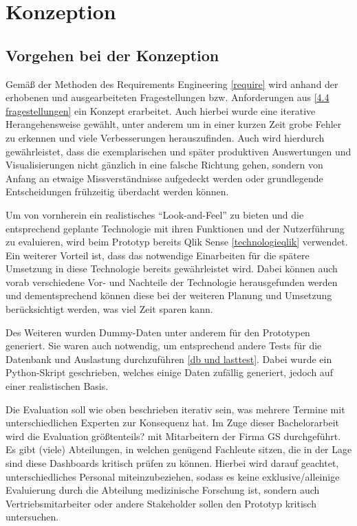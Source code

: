 \chapter{Konzeption}
\label{konzept}

\minitoc\pagebreak

\section{Vorgehen bei der Konzeption}


Gemäß der Methoden des Requirements Engineering \ref{require} wird anhand der erhobenen und ausgearbeiteten Fragestellungen bzw. Anforderungen aus \ref{4.4 fragestellungen} ein Konzept erarbeitet. 
Auch hierbei wurde eine iterative Herangehensweise gewählt, unter anderem um in einer kurzen Zeit grobe Fehler zu erkennen und viele Verbesserungen herauszufinden. 
Auch wird hierdurch gewährleistet, dass die exemplarischen und später produktiven Auswertungen und Visualisierungen nicht gänzlich in eine falsche Richtung gehen, sondern von Anfang an etwaige Missverständnisse aufgedeckt werden oder grundlegende Entscheidungen frühzeitig überdacht werden können.

Um von vornherein ein realistisches "`Look-and-Feel"' zu bieten und die entsprechend geplante Technologie mit ihren Funktionen und der Nutzerführung zu evaluieren, wird beim Prototyp bereits Qlik Sense \ref{technologieqlik} verwendet. 
Ein weiterer Vorteil ist, dass das notwendige Einarbeiten für die spätere Umsetzung in diese Technologie bereits gewährleistet wird. 
Dabei können auch vorab verschiedene Vor- und Nachteile der Technologie herausgefunden werden und dementsprechend können diese bei der weiteren Planung und Umsetzung berücksichtigt werden, was viel Zeit sparen kann.

Des Weiteren wurden Dummy-Daten unter anderem für den Prototypen generiert. 
Sie waren auch notwendig, um entsprechend andere Tests für die Datenbank und Auslastung durchzuführen \ref{db und lasttest}. 
Dabei wurde ein Python-Skript geschrieben, welches einige Daten zufällig generiert, jedoch auf einer realistischen Basis.

Die Evaluation soll wie oben beschrieben iterativ sein, was mehrere Termine mit unterschiedlichen Experten zur Konsequenz hat. 
Im Zuge dieser Bachelorarbeit wird die Evaluation größtenteils? mit Mitarbeitern der Firma \gls{GS} durchgeführt. 
Es gibt (viele) Abteilungen, in welchen genügend Fachleute sitzen, die in der Lage sind diese Dashboards kritisch prüfen zu können. 
Hierbei wird darauf geachtet, unterschiedliches Personal miteinzubeziehen, sodass es keine exklusive/alleinige Evaluierung durch die Abteilung medizinische Forschung ist, sondern auch Vertriebsmitarbeiter oder andere Stakeholder sollen den Prototyp kritisch untersuchen.

